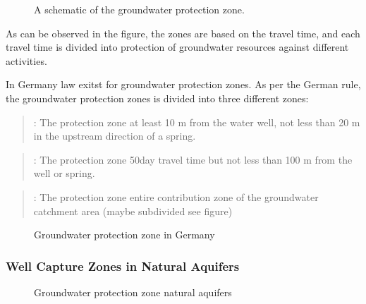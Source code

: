 \documentclass[letterpaper,10pt,english]{sphinxmanual}
\begin{document}
\begin{figure}[htbp]
\centering
\capstart

\noindent{}
\caption{A schematic of the groundwater protection zone.}\label{\detokenize{contents/flow/lecture_06/16_darcy_law_3D:pzones}}\end{figure}

As can be observed in the figure, the zones are based on the travel time, and each travel time is divided into protection of groundwater resources against different activities.

In Germany law  exitst for groundwater protection zones. As per the German rule, the groundwater protection zones is divided into three different zones:
\begin{quote}

 : The  protection zone \sphinxhyphen{} at least 10 m from the water well, not less than 20 m in the upstream direction of a spring.
\end{quote}
\begin{quote}

 : The  protection zone \sphinxhyphen{} 50\sphinxhyphen{}day travel time but not less than 100 m from the well or spring.
\end{quote}
\begin{quote}

 : The  protection zone \sphinxhyphen{} entire contribution zone of the groundwater catchment area (maybe sub\sphinxhyphen{}divided see figure)
\end{quote}

\begin{figure}[htbp]
\centering
\capstart

\noindent{}
\caption{Groundwater protection zone in Germany}\label{\detokenize{contents/flow/lecture_06/16_darcy_law_3D:pzones-de}}\end{figure}


\subsubsection{Well Capture Zones in Natural Aquifers}
\label{\detokenize{contents/flow/lecture_06/16_darcy_law_3D:well-capture-zones-in-natural-aquifers}}
\begin{figure}[htbp]
\centering
\capstart

\noindent{}
\caption{Groundwater protection zone natural aquifers}\label{\detokenize{contents/flow/lecture_06/16_darcy_law_3D:pzones-nat}}\end{figure}
\end{document}
